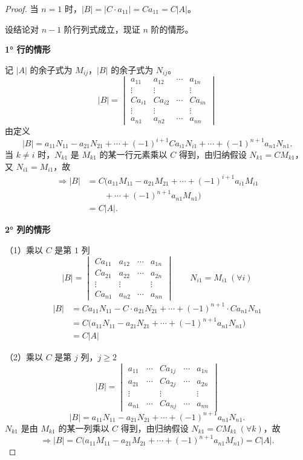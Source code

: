 \begin{proof}
当 $n=1$ 时，$|B|=|C\cdot a_{11}|=Ca_{11}=C|A|$。

设结论对 $n-1$ 阶行列式成立，现证 $n$ 阶的情形。

\textbf{1° 行的情形}

记 $|A|$ 的余子式为 $M_{ij}$，$|B|$ 的余子式为 $N_{ij}$。
\[
|B|=\begin{vmatrix}
a_{11} & a_{12} & \cdots & a_{1n}\\
\vdots & \vdots & & \vdots\\
Ca_{i1} & Ca_{i2} & \cdots & Ca_{in}\\
\vdots & \vdots & & \vdots\\
a_{n1} & a_{n2} & \cdots & a_{nn}
\end{vmatrix}
\]
由定义
\[
|B|=a_{11}N_{11}-a_{21}N_{21}+\cdots+(-1)^{i+1}Ca_{i1}N_{i1}+\cdots+(-1)^{n+1}a_{n1}N_{n1}.
\]
当 $k\ne i$ 时，$N_{k1}$ 是 $M_{k1}$ 的某一行元素乘以 $C$ 得到，由归纳假设 $N_{k1}=CM_{k1}$，又 $N_{i1}=M_{i1}$，故
\begin{align*}
\Rightarrow|B|&=C\Big(a_{11}M_{11}-a_{21}M_{21}+\cdots+(-1)^{i+1}a_{i1}M_{i1}\\
&\qquad+\cdots+(-1)^{n+1}a_{n1}M_{n1}\Big)\\
&=C|A|.
\end{align*}

\textbf{2° 列的情形}

（1）乘以 $C$ 是第 $1$ 列
\[
|B|=\begin{vmatrix}
Ca_{11} & a_{12} & \cdots & a_{1n}\\
Ca_{21} & a_{22} & \cdots & a_{2n}\\
\vdots & \vdots & & \vdots\\
Ca_{n1} & a_{n2} & \cdots & a_{nn}
\end{vmatrix}
\qquad N_{i1}=M_{i1}\ (\forall i)
\]
\begin{align*}
|B|&=Ca_{11}N_{11}-C\cdot a_{21}N_{21}+\cdots+(-1)^{n+1}\cdot Ca_{n1}N_{n1}\\
&=C\Big(a_{11}N_{11}-a_{21}N_{21}+\cdots+(-1)^{n+1}a_{n1}N_{n1}\Big)\\
&=C|A|
\end{align*}


（2）乘以 $C$ 是第 $j$ 列，$j\ge 2$
\[
|B|=\begin{vmatrix}
a_{11} & \cdots & Ca_{1j} & \cdots & a_{1n}\\
a_{21} & \cdots & Ca_{2j} & \cdots & a_{2n}\\
\vdots & & \vdots & & \vdots\\
a_{n1} & \cdots & Ca_{nj} & \cdots & a_{nn}
\end{vmatrix}
\]
\[
|B|=a_{11}N_{11}-a_{21}N_{21}+\cdots+(-1)^{n+1}a_{n1}N_{n1}.
\]
$N_{k1}$ 是由 $M_{k1}$ 的某一列乘以 $C$ 得到，由归纳假设 $N_{k1}=CM_{k1}\ (\forall k)$，故
\[
\Rightarrow|B|=C\Big(a_{11}M_{11}-a_{21}M_{21}+\cdots+(-1)^{n+1}a_{n1}M_{n1}\Big)=C|A|.
\]
\end{proof}

